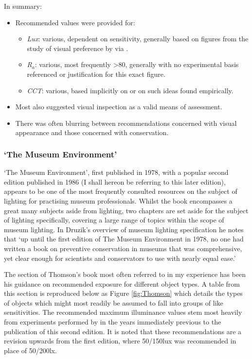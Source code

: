 \noindent
In summary:
\begin{itemize}
\item Recommended values were provided for:
\begin{itemize}
\item \emph{Lux}: various, dependent on sensitivity, generally based on figures from the study of visual preference by \citet{loe_preferred_1982} via \citet{thomson_museum_1978}.
\item \emph{R$_a$}: various, most frequently \textgreater 80, generally with no experimental basis referenced or justification for this exact figure.
\item \emph{\gls{CCT}}: various, based implicitly on \citet{kruithof_tubular_1941} or on such ideas found empirically.
\end{itemize}
\item Most also suggested visual inspection as a valid means of assessment.
\item There was often blurring between recommendations concerned with visual appearance and those concerned with conservation. 
\end{itemize}

\subsubsection{`The Museum Environment'}

`The Museum Environment', first published in 1978\citep{thomson_museum_1978}, with a popular second edition published in 1986\citep{thomson_museum_1986} (I shall hereon be referring to this later edition), appears to be one of the most frequently consulted resources on the subject of lighting for practising museum professionals. Whilst the book encompasses a great many subjects aside from lighting, two chapters are set aside for the subject of lighting specifically, covering a large range of topics within the scope of museum lighting. In Druzik's overview of museum lighting specification \citep{druzik_museum_2007} he notes that ‘up until the first edition of The Museum Environment in 1978, no one had written a book on preventive conservation in museums that was comprehensive, yet clear enough for scientists and conservators to use with nearly equal ease.’

The section of Thomson’s book most often referred to in my experience has been his guidance on recommended exposure for different object types. A table from this section is reproduced below as Figure \ref{fig:Thomson} which details the types of objects which might most readily be assumed to fall into groups of like sensitivities. The recommended maximum illuminance values stem most heavily from experiments performed by \citet{loe_preferred_1982} in the years immediately previous to the publication of this second edition. It is noted that these recommendations are a revision upwards from the first edition, where 50/150lux was recommended in place of 50/200lx.

